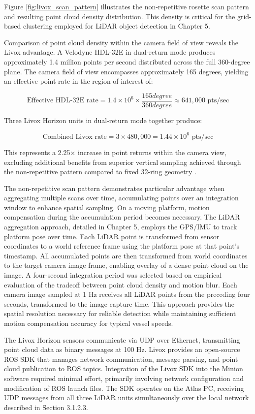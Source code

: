 \documentclass{erauthesis}
\begin{document}
Figure \ref{fig:livox_scan_pattern} illustrates the non-repetitive rosette scan pattern and resulting point cloud density distribution.
This density is critical for the grid-based clustering employed for \ac{LiDAR} object detection in Chapter 5.

Comparison of point cloud density within the camera field of view reveals the Livox advantage.
A Velodyne HDL-32E in dual-return mode produces approximately 1.4 million points per second distributed across the full 360-degree plane.
The camera field of view encompasses approximately 165 degrees, yielding an effective point rate in the region of interest of:

$$\text{Effective HDL-32E rate} = 1.4 \times 10^6 \times \frac{165 degree}{360 degree} \approx 641,000 \text{ pts/sec}$$

Three Livox Horizon units in dual-return mode together produce:

$$\text{Combined Livox rate} = 3 \times 480,000 = 1.44 \times 10^6 \text{ pts/sec}$$

This represents a 2.25× increase in point returns within the camera view, excluding additional benefits from superior vertical sampling achieved through the non-repetitive pattern compared to fixed 32-ring geometry \cite{thompson2023}.

The non-repetitive scan pattern demonstrates particular advantage when aggregating multiple scans over time, accumulating points over an integration window to enhance spatial sampling.
On a moving platform, motion compensation during the accumulation period becomes necessary.
The \ac{LiDAR} aggregation approach, detailed in Chapter 5, employs the \ac{GPS}/\ac{IMU} to track platform pose over time.
Each \ac{LiDAR} point is transformed from sensor coordinates to a world reference frame using the platform pose at that point's timestamp.
All accumulated points are then transformed from world coordinates to the target camera image frame, enabling overlay of a dense point cloud on the image.
A four-second integration period was selected based on empirical evaluation of the tradeoff between point cloud density and motion blur.
Each camera image sampled at 1 Hz receives all \ac{LiDAR} points from the preceding four seconds, transformed to the image capture time.
This approach provides the spatial resolution necessary for reliable detection while maintaining sufficient motion compensation accuracy for typical vessel speeds.

The Livox Horizon sensors communicate via \ac{UDP} over Ethernet, transmitting point cloud data as binary messages at 100 Hz.
Livox provides an open-source \ac{ROS} SDK that manages network communication, message parsing, and point cloud publication to \ac{ROS} topics.
Integration of the Livox SDK into the Minion software required minimal effort, primarily involving network configuration and modification of \ac{ROS} launch files.
The SDK operates on the Atlas PC, receiving \ac{UDP} messages from all three \ac{LiDAR} units simultaneously over the local network described in Section 3.1.2.3.
\end{document}
